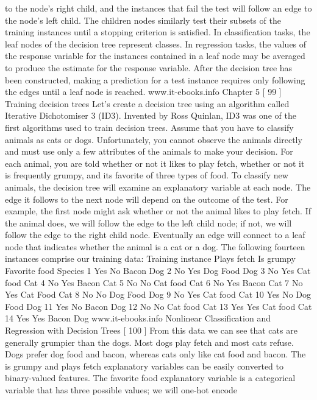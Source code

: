 to the node's right child, and the instances that fail the test will follow an edge to
the node's left child. The children nodes similarly test their subsets of the training
instances until a stopping criterion is satisfied. In classification tasks, the leaf nodes
of the decision tree represent classes. In regression tasks, the values of the response
variable for the instances contained in a leaf node may be averaged to produce the
estimate for the response variable. After the decision tree has been constructed,
making a prediction for a test instance requires only following the edges until a
leaf node is reached.
www.it-ebooks.info
Chapter 5
[ 99 ]
Training decision trees
Let's create a decision tree using an algorithm called Iterative Dichotomiser 3 (ID3).
Invented by Ross Quinlan, ID3 was one of the first algorithms used to train decision
trees. Assume that you have to classify animals as cats or dogs. Unfortunately, you
cannot observe the animals directly and must use only a few attributes of the animals
to make your decision. For each animal, you are told whether or not it likes to play
fetch, whether or not it is frequently grumpy, and its favorite of three types of food.
To classify new animals, the decision tree will examine an explanatory variable at
each node. The edge it follows to the next node will depend on the outcome of the test.
For example, the first node might ask whether or not the animal likes to play fetch. If
the animal does, we will follow the edge to the left child node; if not, we will follow
the edge to the right child node. Eventually an edge will connect to a leaf node that
indicates whether the animal is a cat or a dog.
The following fourteen instances comprise our training data:
Training instance Plays fetch Is grumpy Favorite food Species
1 Yes No Bacon Dog
2 No Yes Dog Food Dog
3 No Yes Cat food Cat
4 No Yes Bacon Cat
5 No No Cat food Cat
6 No Yes Bacon Cat
7 No Yes Cat Food Cat
8 No No Dog Food Dog
9 No Yes Cat food Cat
10 Yes No Dog Food Dog
11 Yes No Bacon Dog
12 No No Cat food Cat
13 Yes Yes Cat food Cat
14 Yes Yes Bacon Dog
www.it-ebooks.info
Nonlinear Classification and Regression with Decision Trees
[ 100 ]
From this data we can see that cats are generally grumpier than the dogs. Most dogs
play fetch and most cats refuse. Dogs prefer dog food and bacon, whereas cats only
like cat food and bacon. The is grumpy and plays fetch explanatory variables
can be easily converted to binary-valued features. The favorite food explanatory
variable is a categorical variable that has three possible values; we will one-hot encode
